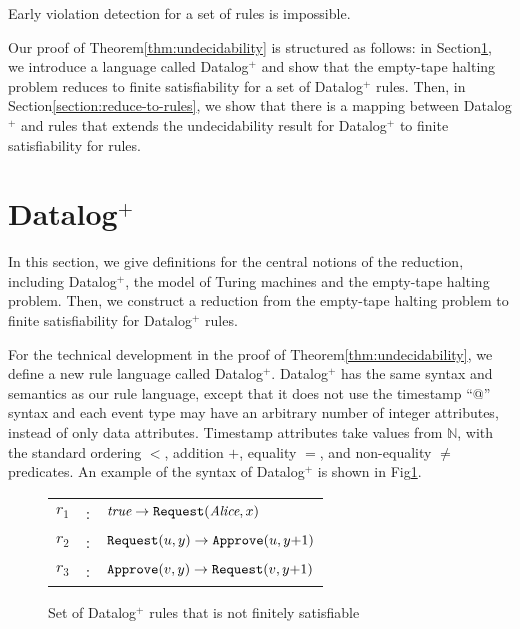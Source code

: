 \begin{corollary}\label{col:undecidability}
Early violation detection for a set of rules is impossible.
\end{corollary}

Our proof of Theorem\:\ref{thm:undecidability} is structured as follows:
in Section\:\ref{section:finite-satisfiability-undecidable},
we introduce a language called Datalog$^{+}$
and show that the empty-tape halting problem
reduces to finite satisfiability for a set of Datalog$^{+}$ rules.
Then,
in Section\:\ref{section:reduce-to-rules},
we show that there is a mapping between
Datalog$^{+}$ and rules
that extends the undecidability result
for Datalog$^{+}$
to finite satisfiability for rules.

\section{Datalog$^{+}$}
\label{section:finite-satisfiability-undecidable}

In this section, we give definitions
for the central notions of the reduction,
including
Datalog$^{+}$,
the model of Turing machines
and the empty-tape halting problem.
Then,
we construct a reduction from the empty-tape halting problem
to finite satisfiability for Datalog$^{+}$ rules.   

For the technical development in the proof of Theorem\:\ref{thm:undecidability},
we define a new rule language called Datalog$^{+}$.
Datalog$^{+}$ has the same syntax and semantics as our rule language,
except that it does not use the timestamp ``@'' syntax
and each event type may have 
an arbitrary number of integer attributes,
instead of only data attributes.
Timestamp attributes take values from $\mathbb{N}$,
with the standard ordering $<$, addition $+$, equality $=$, and non-equality $\neq$ predicates.
An example of the syntax of Datalog$^{+}$ is shown in Fig\:\ref{fig:datalog-plus-syntax}.

\begin{figure}[h!]
    \centering
\begin{tabular}{|lcl|}
\hline
$r_1$ &:& $\textit{true} \rightarrow \texttt{Request}(\mbox{\em Alice},x)$\\
$r_2$ &:& $\texttt{Request}(u,y) \rightarrow \texttt{Approve}(u,y{+}1)$\\
$r_3$ &:& $\texttt{Approve}(v,y) \rightarrow \texttt{Request}(v,y{+}1)$\\
\hline
\end{tabular}
    \caption{Set of Datalog$^{+}$ rules that is not finitely satisfiable}
    \label{fig:datalog-plus-syntax}
\end{figure}


